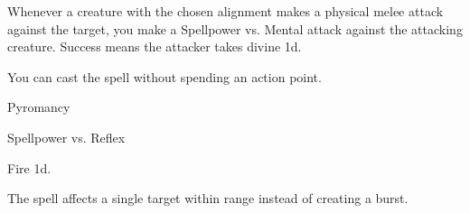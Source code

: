 
Whenever a creature with the chosen alignment makes a physical melee attack against the target, you make a Spellpower vs. Mental attack against the attacking creature.
Success means the attacker takes divine  \minus1d.






You can cast the spell without spending an action point.




\newpage
\begin{spellsection}{Pyromancy}

\begin{spellheader}
\end{spellheader}

\begin{spellcontent}

\begin{spelltargetinginfo}




\end{spelltargetinginfo}


\begin{spelleffects}




\begin{spellattack}{Spellpower vs. Reflex}


\hit Fire  \minus1d.


\end{spellattack}





\end{spelleffects}

\end{spellcontent}
\begin{spellfooter}


\end{spellfooter}
\begin{spellsubcontent}


\begin{spellcantrip}
The spell affects a single target within range instead of creating a burst.
\end{spellcantrip}


\end{spellsubcontent}
\end{spellsection}


